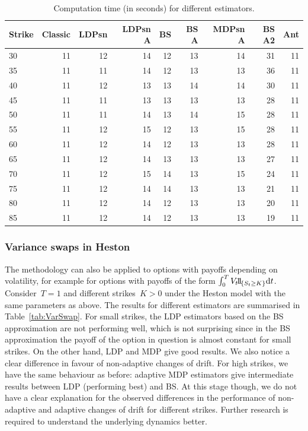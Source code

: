 \begin{table}[H]
\centering
\begin{tabular}{lrrrrrrrr}
\toprule
Strike &  Classic &  LDPsn &  LDPsn A &  BS &  BS A &  MDPsn A &  BS A2 &  Ant \\
\midrule
30 &       11 &     12 &       14 &  12 &    13 &           14  &     31 &   11 \\
35 &       11 &     11 &       14 &  12 &    13 &           13  &     36 &   11 \\
40 &       11 &     12 &       13 &  13 &    14 &           14  &     30 &   11 \\
45 &       11 &     11 &       13 &  13 &    13 &           13  &     28 &   11 \\
50 &       11 &     11 &       14 &  13 &    14 &           15  &     28 &   11 \\
55 &       11 &     12 &       15 &  12 &    13 &           15  &     28 &   11 \\
60 &       11 &     12 &       14 &  12 &    13 &           13  &     28 &   11 \\
65 &       11 &     12 &       14 &  13 &    13 &           13  &     27 &   11 \\
70 &       11 &     12 &       15 &  14 &    13 &           15  &     24 &   11 \\
75 &       11 &     12 &       14 &  14 &    13 &           13  &     21 &   11 \\
80 &       11 &     12 &       14 &  12 &    13 &           13  &     20 &   11 \\
85 &       11 &     12 &       14 &  12 &    13 &           13  &     19 &   11 \\
\bottomrule
\end{tabular}
\bigskip
\caption{Computation time (in seconds) for different estimators.}\label{tab:CompTime}
\end{table}

\subsubsection{Variance swaps in Heston}
The methodology can also be applied to options with payoffs depending on volatility,
for example for options with payoffs of the form
$\int_0^T V_t \ind_{\{S_t\geq K\}}\D t$.
Consider~$T = 1$ and different strikes~$K>0$ under the Heston model with the same parameters as above. The results for different estimators are summarised in Table~\ref{tab:VarSwap}.
For small strikes, the LDP estimators based on the BS approximation are not performing well, which is not surprising since in the BS approximation the payoff of the option in question is almost constant for small strikes. On the other hand, LDP and MDP give good results. We also notice a clear difference in favour of non-adaptive changes of drift.
For high strikes, we have the same behaviour as before: adaptive MDP estimators give intermediate results between LDP (performing best) and BS. At this stage though, we do not have a clear explanation for the observed differences in the performance of non-adaptive and adaptive changes of drift for different strikes. Further research is required to understand the underlying dynamics better.

